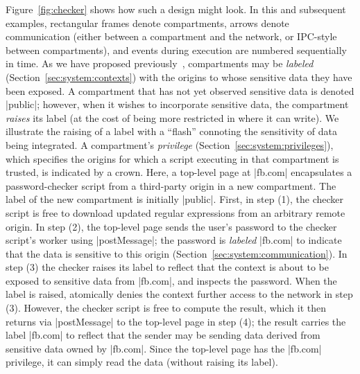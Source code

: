 Figure~\ref{fig:checker} shows how such a design might look. In this
and subsequent examples, rectangular frames denote compartments,
arrows denote communication (either between a compartment and the
network, or IPC-style between compartments), and events during
execution are numbered sequentially in time. As we have proposed
previously~\cite{yang:2013:towards}, compartments may be
\emph{labeled} (Section~\ref{sec:system:contexts}) with the origins to
whose sensitive data they have been exposed. A compartment that has
not yet observed sensitive data is denoted \js|public|; however, when
it wishes to incorporate sensitive data, the compartment \emph{raises}
its label (at the cost of being more restricted in where it can
write). We illustrate the raising of a label with a ``flash''
connoting the sensitivity of data being integrated.  A compartment's
\emph{privilege} (Section~\ref{sec:system:privileges}), which specifies the
origins for which a script executing in that compartment is trusted,
is indicated by a crown. Here, a top-level page at \js|fb.com|
encapsulates a password-checker script from a third-party origin in a
new compartment. The label of the new compartment is initially
\js|public|.
First, in step (1), the checker script is free to
download updated regular expressions from an arbitrary remote
origin. In step (2), the top-level page sends the user's password to
the checker script's worker using \js|postMessage|; the password is
\emph{labeled} \js|fb.com| to indicate that the data is sensitive to
this origin (Section~\ref{sec:system:communication}).
%
%
In step (3) the checker raises its label to reflect that the context
is about to be exposed to sensitive data from \js|fb.com|, and
inspects the password.
%
When the label is raised, \sys{} atomically denies the context further
access to the network in step (3).
%
However, the checker script is free to compute the result, which
it then returns via \js|postMessage| to the top-level page in step (4); the
result carries the label \js|fb.com| to reflect that the sender may be
sending data derived from sensitive data owned by \js|fb.com|.
%
Since the top-level page has the \js|fb.com| privilege, it can simply
read the data (without raising its label).

